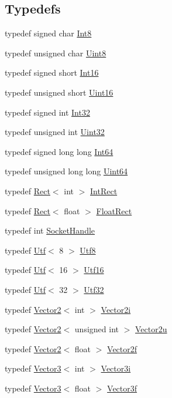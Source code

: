 \subsection*{Typedefs}
\begin{DoxyCompactItemize}
\item 
typedef signed char \hyperlink{namespacesf_a69b109973eac74e22b97e5339bdb68dd}{Int8}
\item 
typedef unsigned char \hyperlink{namespacesf_a4ef3d630785c4f296f9b4f274c33d78e}{Uint8}
\item 
typedef signed short \hyperlink{namespacesf_a3c8e10435e2a310a7741755e66b5c94e}{Int16}
\item 
typedef unsigned short \hyperlink{namespacesf_a2fcaf787248b0b83dfb6b145ca348246}{Uint16}
\item 
typedef signed int \hyperlink{namespacesf_ac2dfd4952377a26dee4750e2e4a30a15}{Int32}
\item 
typedef unsigned int \hyperlink{namespacesf_aa746fb1ddef4410bddf198ebb27e727c}{Uint32}
\item 
typedef signed long long \hyperlink{namespacesf_a2840579fed3494d9f330baf7a5a19903}{Int64}
\item 
typedef unsigned long long \hyperlink{namespacesf_add9ac83466d96b9f50a009b9f4064266}{Uint64}
\item 
typedef \hyperlink{classsf_1_1_rect}{Rect}$<$ int $>$ \hyperlink{namespacesf_aae67411782674934f78d55fa3af18403}{Int\-Rect}
\item 
typedef \hyperlink{classsf_1_1_rect}{Rect}$<$ float $>$ \hyperlink{namespacesf_aed4e58f586b2eed2621c0365d0b7554e}{Float\-Rect}
\item 
typedef int \hyperlink{namespacesf_aefabb521d8f5eec9e6a9b521271d20d1}{Socket\-Handle}
\item 
typedef \hyperlink{classsf_1_1_utf}{Utf}$<$ 8 $>$ \hyperlink{namespacesf_ab78b7f576a82034d14eab92becc15301}{Utf8}
\item 
typedef \hyperlink{classsf_1_1_utf}{Utf}$<$ 16 $>$ \hyperlink{namespacesf_ae30b6ea05a1723d608853ebc3043e53d}{Utf16}
\item 
typedef \hyperlink{classsf_1_1_utf}{Utf}$<$ 32 $>$ \hyperlink{namespacesf_a51a40f697607908d2e9f58e67f4c89a3}{Utf32}
\item 
typedef \hyperlink{classsf_1_1_vector2}{Vector2}$<$ int $>$ \hyperlink{namespacesf_ace09dd1447d74c6e9ba56ae874c094e1}{Vector2i}
\item 
typedef \hyperlink{classsf_1_1_vector2}{Vector2}$<$ unsigned int $>$ \hyperlink{namespacesf_aaa02ba42bf79b001a376fe9d79254cb3}{Vector2u}
\item 
typedef \hyperlink{classsf_1_1_vector2}{Vector2}$<$ float $>$ \hyperlink{namespacesf_acf03098c2577b869e2fa6836cc48f1a0}{Vector2f}
\item 
typedef \hyperlink{classsf_1_1_vector3}{Vector3}$<$ int $>$ \hyperlink{namespacesf_ad066a8774efaf7b623df8909ba219dc7}{Vector3i}
\item 
typedef \hyperlink{classsf_1_1_vector3}{Vector3}$<$ float $>$ \hyperlink{namespacesf_af97357d7d32e7d6a700d03be2f3b4811}{Vector3f}
\end{DoxyCompactItemize}
